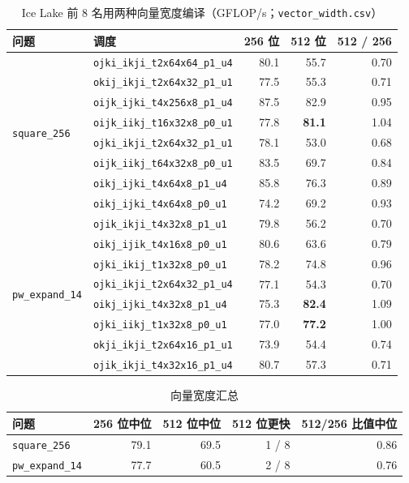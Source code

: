 \documentclass[11pt,a4paper]{ctexart}
\newcommand{\sk}[1]{\texttt{#1}}
\begin{document}
\begin{table}[H]
\centering\small
\caption{Ice Lake 前 8 名用两种向量宽度编译（GFLOP/s；\texttt{vector\_width.csv}）}\label{tab:width}
\begin{tabular}{llrrr}
\toprule
问题 & 调度 & 256 位 & 512 位 & 512 / 256 \\
\midrule
\multirow{8}{*}{\sk{square\_256}}
 & \sk{ojki\_ikji\_t2x64x64\_p1\_u4} & 80.1 & 55.7 & 0.70 \\
 & \sk{okij\_ikji\_t2x64x32\_p1\_u1} & 77.5 & 55.3 & 0.71 \\
 & \sk{oijk\_ijki\_t4x256x8\_p1\_u4} & 87.5 & 82.9 & 0.95 \\
 & \sk{oijk\_iikj\_t16x32x8\_p0\_u1} & 77.8 & \textbf{81.1} & 1.04 \\
 & \sk{ojki\_ikji\_t2x64x32\_p1\_u1} & 78.1 & 53.0 & 0.68 \\
 & \sk{oijk\_iikj\_t64x32x8\_p0\_u1} & 83.5 & 69.7 & 0.84 \\
 & \sk{oikj\_ijki\_t4x64x8\_p1\_u4} & 85.8 & 76.3 & 0.89 \\
 & \sk{oikj\_ijki\_t4x64x8\_p0\_u1} & 74.2 & 69.2 & 0.93 \\
\midrule
\multirow{8}{*}{\sk{pw\_expand\_14}}
 & \sk{ojik\_ikji\_t4x32x8\_p1\_u1} & 79.8 & 56.2 & 0.70 \\
 & \sk{oikj\_ijik\_t4x16x8\_p0\_u1} & 80.6 & 63.6 & 0.79 \\
 & \sk{ojki\_ikij\_t1x32x8\_p0\_u1} & 78.2 & 74.8 & 0.96 \\
 & \sk{ojki\_ikji\_t2x64x32\_p1\_u4} & 77.1 & 54.3 & 0.70 \\
 & \sk{oikj\_ijki\_t4x32x8\_p1\_u4} & 75.3 & \textbf{82.4} & 1.09 \\
 & \sk{ojki\_iikj\_t1x32x8\_p0\_u1} & 77.0 & \textbf{77.2} & 1.00 \\
 & \sk{okji\_ikji\_t2x64x16\_p1\_u1} & 73.9 & 54.4 & 0.74 \\
 & \sk{ojik\_ikji\_t4x32x16\_p1\_u4} & 80.7 & 57.3 & 0.71 \\
\bottomrule
\end{tabular}
\end{table}

\begin{table}[H]
\centering\small
\caption{向量宽度汇总}\label{tab:widthsum}
\begin{tabular}{lrrrr}
\toprule
问题 & 256 位中位 & 512 位中位 & 512 位更快 & 512/256 比值中位 \\
\midrule
\sk{square\_256} & 79.1 & 69.5 & 1 / 8 & 0.86 \\
\sk{pw\_expand\_14} & 77.7 & 60.5 & 2 / 8 & 0.76 \\
\bottomrule
\end{tabular}
\end{table}
\end{document}
